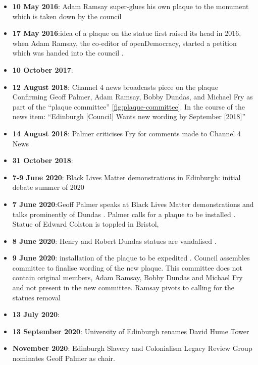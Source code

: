 \documentclass{scrartcl}
\renewcommand{\cite}{\parencite}
\providecommand{\tightlist}{%
  \setlength{\itemsep}{0pt}\setlength{\parskip}{0pt}}
\begin{document}
\begin{appendices}
\begin{itemize}
    \tightlist
    \item \textbf{10 May 2016}: Adam Ramsay super-glues his own plaque to the monument which is taken down by the council \cite{ramsay_2016}
    \item \textbf{17 May 2016}:idea of a plaque on the statue first raised its head in 2016, when Adam Ramsay, the co-editor of openDemocracy, started a petition which was handed into the council \cite{council_2016}.
    \item \textbf{10 October 2017}: \cite{urquhart_2017}
    \item \textbf{12 August 2018}: Channel 4 news broadcasts piece on the plaque \cite{c4n_2018} Confirming Geoff Palmer, Adam Ramsay, Bobby Dundas, and Michael Fry as part of the ``plaque committee'' \ref{fig:plaque-committee}. In the course of the news item: ``Edinburgh [Council] Wants new wording by September [2018]''
    \item \textbf{14 August 2018}: Palmer criticises Fry for comments made to Channel 4 News \cite{logan_2018}
    \item \textbf{31 October 2018}: \cite{bbc_2018}
    \item \textbf{7-9 June 2020}: Black Lives Matter demonstrations in Edinburgh: initial debate summer of 2020 \cite{mccarthy_2022_1}
    \item \textbf{7 June 2020}:Geoff Palmer speaks at Black Lives Matter demonstrations and talks prominently of Dundas \cite{hay_2020_3,youtube_2020,reporter_2020}. Palmer calls for a plaque to be installed \cite{hay_2020_1}. Statue of Edward Colston is toppled in Bristol,   
    \item \textbf{8 June 2020}: Henry and Robert Dundas statues are vandalised \cite{anderson_2021, hay_2020_3}. 
    \item   \textbf{9 June 2020}: installation of the plaque to be expedited \cite{hoffman_2020, daily_2020}. Council assembles committee to finalise wording of the new plaque. This committee does not contain original members, Adam Ramsay, Bobby Dundas and Michael Fry and not present in the new committee. Ramsay pivots to calling for the statues removal \cite{ramsay_2020} 
    \item \textbf{13 July 2020}: \cite{council_2020}
    \item \textbf{13 September 2020}: University of Edinburgh renames David Hume Tower \cite{uoe_2020,bbc_2020}
    \item \textbf{November 2020}: Edinburgh Slavery and Colonialism Legacy Review Group nominates Geoff Palmer as chair.

\end{itemize}
\end{appendices}
\end{document}
